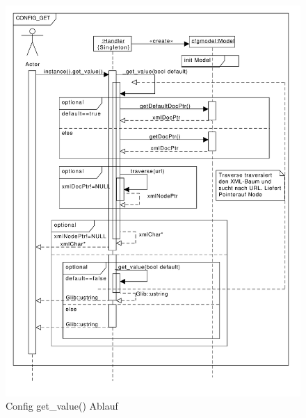 \begin{figure}[htb!]
	\centering
\includegraphics[scale=0.5]{configget.pdf}
\caption{Config get\_value() Ablauf}
\label{c_configget}
\end{figure}



